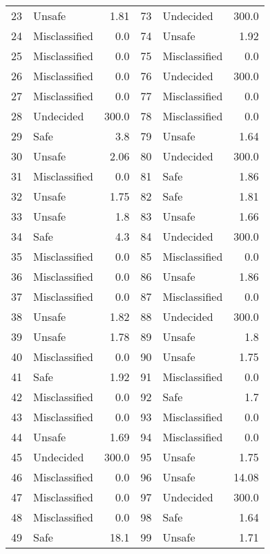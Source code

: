 \begin{table}[!ht]
\begin{tabular}{|llr|llr|}
    23 & Unsafe & 1.81 &    73 & Undecided & 300.0\\ 
    24 & Misclassified & 0.0 &    74 & Unsafe & 1.92\\ 
    25 & Misclassified & 0.0 &    75 & Misclassified & 0.0\\ 
    26 & Misclassified & 0.0 &    76 & Undecided & 300.0\\ 
    27 & Misclassified & 0.0 &    77 & Misclassified & 0.0\\ 
    28 & Undecided & 300.0 &    78 & Misclassified & 0.0\\ 
    29 & Safe & 3.8 &    79 & Unsafe & 1.64\\ 
    30 & Unsafe & 2.06 &    80 & Undecided & 300.0\\ 
    31 & Misclassified & 0.0 &    81 & Safe & 1.86\\ 
    32 & Unsafe & 1.75 &    82 & Safe & 1.81\\ 
    33 & Unsafe & 1.8 &    83 & Unsafe & 1.66\\ 
    34 & Safe & 4.3 &    84 & Undecided & 300.0\\ 
    35 & Misclassified & 0.0 &    85 & Misclassified & 0.0\\ 
    36 & Misclassified & 0.0 &    86 & Unsafe & 1.86\\ 
    37 & Misclassified & 0.0 &    87 & Misclassified & 0.0\\ 
    38 & Unsafe & 1.82 &    88 & Undecided & 300.0\\ 
    39 & Unsafe & 1.78 &    89 & Unsafe & 1.8\\ 
    40 & Misclassified & 0.0 &    90 & Unsafe & 1.75\\ 
    41 & Safe & 1.92 &    91 & Misclassified & 0.0\\ 
    42 & Misclassified & 0.0 &    92 & Safe & 1.7\\ 
    43 & Misclassified & 0.0 &    93 & Misclassified & 0.0\\ 
    44 & Unsafe & 1.69 &    94 & Misclassified & 0.0\\ 
    45 & Undecided & 300.0 &    95 & Unsafe & 1.75\\ 
    46 & Misclassified & 0.0 &    96 & Unsafe & 14.08\\ 
    47 & Misclassified & 0.0 &    97 & Undecided & 300.0\\ 
    48 & Misclassified & 0.0 &    98 & Safe & 1.64\\ 
    49 & Safe & 18.1 &    99 & Unsafe & 1.71\\ 
    \bottomrule
  \end{tabular}
\end{table}

